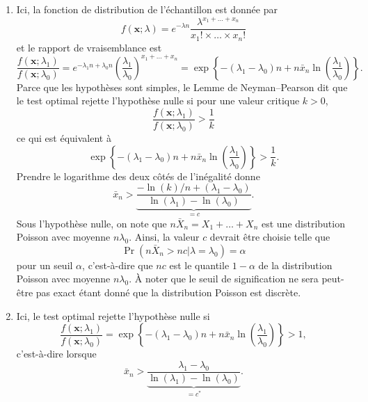 \begin{solution}{6.3}
\begin{enumerate}
\item Ici, la fonction de distribution de l'échantillon est donnée par
$$
f(\boldsymbol{x}; \lambda) = e^{-\lambda n} \frac{\lambda^{x_1 + \dots + x_n}}{x_1! \times \dots \times x_n!}
$$
et le rapport de vraisemblance est
$$
\frac{f(\boldsymbol{x}; \lambda_1)}{f(\boldsymbol{x}; \lambda_0)} = e^{-\lambda_1 n + \lambda_0 n} \left(\frac{\lambda_1}{\lambda_0}\right)^{x_1 + \dots + x_n} = \exp\left\{ -(\lambda_1 - \lambda_0)n + n \bar x_n \ln\left(\frac{\lambda_1}{\lambda_0}\right) \right\}.
$$
Parce que les hypothèses sont simples, le Lemme de Neyman--Pearson dit que le test optimal rejette l'hypothèse nulle si pour une valeur critique $k>0$,
$$
\frac{f(\boldsymbol{x}; \lambda_1)}{f(\boldsymbol{x}; \lambda_0)} > \frac{1}{k}
$$
ce qui est équivalent à
$$
\exp\left\{ -(\lambda_1 - \lambda_0)n + n \bar x_n \ln\left(\frac{\lambda_1}{\lambda_0}\right) \right\} > \frac{1}{k}.
$$
Prendre le logarithme des deux côtés de l'inégalité donne
$$
\bar x_n > \underbrace{\frac{-\ln(k)/n + (\lambda_1 -\lambda_0)}{\ln(\lambda_1) - \ln(\lambda_0)}}_{=c}.
$$
Sous l'hypothèse nulle, on note que $n\bar X_n = X_1 + \dots + X_n$ est une distribution Poisson avec moyenne $n\lambda_0$. Ainsi, la valeur $c$ devrait être choisie telle que
$$
\Pr( n \bar X_n > nc  |  \lambda = \lambda_0) = \alpha
$$
pour un seuil $\alpha$, c'est-à-dire que $nc$ est le quantile $1-\alpha$ de la distribution Poisson avec moyenne $n\lambda_0$. À noter que le seuil de signification ne sera peut-être pas exact étant donné que la distribution Poisson est discrète.

\item Ici, le test optimal rejette l'hypothèse nulle si
$$
\frac{f(\boldsymbol{x}; \lambda_1)}{f(\boldsymbol{x}; \lambda_0)} = \exp\left\{ -(\lambda_1 - \lambda_0)n + n \bar x_n \ln\left(\frac{\lambda_1}{\lambda_0}\right) \right\} > 1,
$$
c'est-à-dire lorsque
$$
\bar x_n > \underbrace{\frac{\lambda_1 -\lambda_0}{\ln(\lambda_1) - \ln(\lambda_0)}}_{=c^*}.
$$


\end{enumerate}
\end{solution}
